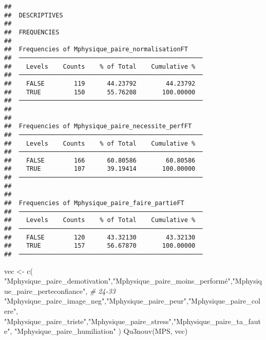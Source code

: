 \documentclass[
]{article}
\newenvironment{Shaded}{\begin{snugshade}}{\end{snugshade}}
\newcommand{\CommentTok}[1]{\textcolor[rgb]{0.56,0.35,0.01}{\textit{#1}}}
\newcommand{\FunctionTok}[1]{\textcolor[rgb]{0.00,0.00,0.00}{#1}}
\newcommand{\NormalTok}[1]{#1}
\newcommand{\OtherTok}[1]{\textcolor[rgb]{0.56,0.35,0.01}{#1}}
\newcommand{\StringTok}[1]{\textcolor[rgb]{0.31,0.60,0.02}{#1}}
\begin{document}
\begin{verbatim}
## 
##  DESCRIPTIVES
## 
##  FREQUENCIES
## 
##  Frequencies of Mphysique_paire_normalisationFT     
##  ────────────────────────────────────────────────── 
##    Levels    Counts    % of Total    Cumulative %   
##  ────────────────────────────────────────────────── 
##    FALSE        119      44.23792        44.23792   
##    TRUE         150      55.76208       100.00000   
##  ────────────────────────────────────────────────── 
## 
## 
##  Frequencies of Mphysique_paire_necessite_perfFT    
##  ────────────────────────────────────────────────── 
##    Levels    Counts    % of Total    Cumulative %   
##  ────────────────────────────────────────────────── 
##    FALSE        166      60.80586        60.80586   
##    TRUE         107      39.19414       100.00000   
##  ────────────────────────────────────────────────── 
## 
## 
##  Frequencies of Mphysique_paire_faire_partieFT      
##  ────────────────────────────────────────────────── 
##    Levels    Counts    % of Total    Cumulative %   
##  ────────────────────────────────────────────────── 
##    FALSE        120      43.32130        43.32130   
##    TRUE         157      56.67870       100.00000   
##  ──────────────────────────────────────────────────
\end{verbatim}

\begin{Shaded}
\begin{Highlighting}[]
\NormalTok{vec }\OtherTok{\textless{}{-}} \FunctionTok{c}\NormalTok{(}
    \StringTok{"Mphysique\_paire\_demotivation"}\NormalTok{,}\StringTok{"Mphysique\_paire\_moins\_performé"}\NormalTok{,}\StringTok{"Mphysique\_paire\_perteconfiance"}\NormalTok{,   }\CommentTok{\# 24{-}33}
    \StringTok{"Mphysique\_paire\_image\_neg"}\NormalTok{,}\StringTok{"Mphysique\_paire\_peur"}\NormalTok{,}\StringTok{"Mphysique\_paire\_colere"}\NormalTok{,}
     \StringTok{"Mphysique\_paire\_triste"}\NormalTok{,}\StringTok{"Mphysique\_paire\_stress"}\NormalTok{,}\StringTok{"Mphysique\_paire\_ta\_faute"}\NormalTok{,}
     \StringTok{"Mphysique\_paire\_humiliation"}  
\NormalTok{     )}
\FunctionTok{Qu3nouv}\NormalTok{(MPS, vec)}
\end{Highlighting}
\end{Shaded}
\end{document}
